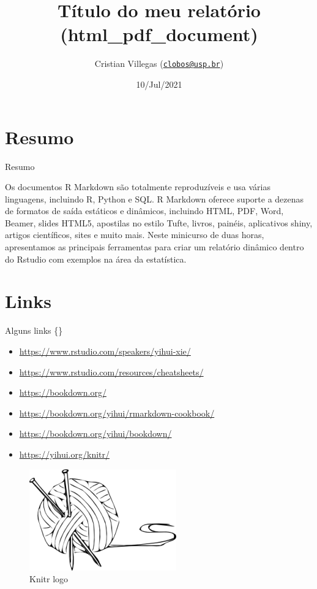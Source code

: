 \documentclass[10pt,ignorenonframetext,]{beamer}
\title{Título do meu relatório (html\_pdf\_document)}
\author{Cristian Villegas
(\href{mailto:clobos@usp.br}{\nolinkurl{clobos@usp.br}})}
\date{10/Jul/2021}
\begin{document}
\frame{\titlepage}

\begin{frame}
\tableofcontents[hideallsubsections]
\end{frame}
\hypertarget{resumo}{%
\section{Resumo}\label{resumo}}

\begin{frame}{Resumo}
\protect\hypertarget{resumo-1}{}

Os documentos R Markdown são totalmente reproduzíveis e usa várias
linguagens, incluindo R, Python e SQL. R Markdown oferece suporte a
dezenas de formatos de saída estáticos e dinâmicos, incluindo HTML, PDF,
Word, Beamer, slides HTML5, apostilas no estilo Tufte, livros, painéis,
aplicativos shiny, artigos científicos, sites e muito mais. Neste
minicurso de duas horas, apresentamos as principais ferramentas para
criar um relatório dinâmico dentro do Rstudio com exemplos na área da
estatística.

\end{frame}

\hypertarget{links}{%
\section{Links}\label{links}}

\begin{frame}{Alguns links \{\label{links}\}}
\protect\hypertarget{alguns-links}{}

\begin{itemize}
\item
  \url{https://www.rstudio.com/speakers/yihui-xie/}
\item
  \url{https://www.rstudio.com/resources/cheatsheets/}
\item
  \url{https://bookdown.org/}
\item
  \url{https://bookdown.org/yihui/rmarkdown-cookbook/}
\item
  \url{https://bookdown.org/yihui/bookdown/}
\item
  \url{https://yihui.org/knitr/}
\end{itemize}

\begin{figure}

{\centering \includegraphics[width=0.5\linewidth]{knit_logo} 

}

\caption{Knitr logo}\label{fig:unnamed-chunk-2}
\end{figure}

\end{frame}
\end{document}
